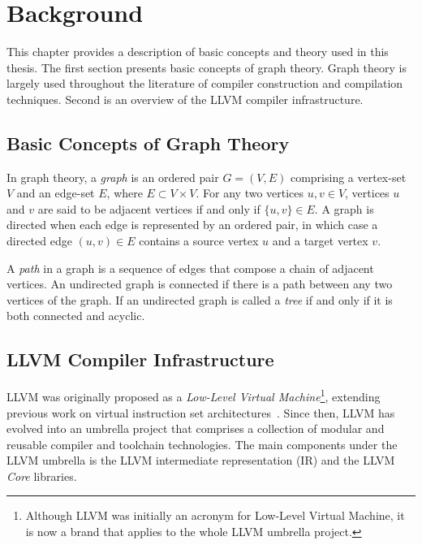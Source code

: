 \chapter{Background}

This chapter provides a description of basic concepts and theory used in this thesis.
The first section presents basic concepts of graph theory.
Graph theory is largely used throughout the literature of compiler construction and compilation techniques.
Second is an overview of the LLVM compiler infrastructure.

\section{Basic Concepts of Graph Theory}

In graph theory, a \textit{graph} is an ordered pair $G = (V,E)$ comprising a vertex-set $V$ and an edge-set $E$, where $E \subset V\times V$.
For any two vertices $u,v\in V$, vertices $u$ and $v$ are said to be adjacent vertices if and only if $\{u,v\}\in E$.
A graph is directed when each edge is represented by an ordered pair, in which case a directed edge $(u,v)\in E$ contains a source vertex $u$ and a target vertex $v$.

A \textit{path} in a graph is a sequence of edges that compose a chain of adjacent vertices.
An undirected graph is connected if there is a path between any two vertices of the graph.
If an undirected graph is called a \textit{tree} if and only if it is both connected and acyclic.



\section{LLVM Compiler Infrastructure}

LLVM was originally proposed as a \textit{Low-Level Virtual Machine}\footnote{Although LLVM was initially an acronym for Low-Level Virtual Machine, it is now a brand that applies to the whole LLVM umbrella project.}, extending previous work on virtual instruction set architectures~\citep{adve03,lattner04}.
Since then, LLVM has evolved into an umbrella project that comprises a collection of modular and reusable compiler and toolchain technologies.
The main components under the LLVM umbrella is the LLVM intermediate representation (IR) and the LLVM \textit{Core} libraries.

